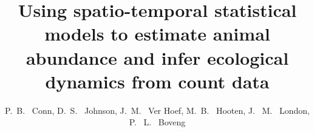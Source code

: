 \documentclass[times,mee,doublespace,]{besauth2}
\begin{document}


\title{Using spatio-temporal statistical models to estimate animal abundance and infer ecological dynamics from count data} %

\author{P.~B. ~Conn\corrauth, D.~S. ~Johnson, J.~M. ~Ver Hoef, M.~B. ~Hooten,  J. ~M. ~London, P. ~L. ~Boveng}


\address{National Marine Mammal Laboratory, Alaska Fisheries Science Center, NOAA National Marine Fisheries Service, 7600 Sand Point Way NE, Seattle, WA 98115 USA;U.S. Geological Survey, Colorado Cooperative Fish and Wildlife Research Unit, Colorado State University, Fort Collins, CO 80523 USA; Department of Fish, Wildlife, and Conservation Biology, Colorado State University, Fort Collins, CO 80523 USA;Department of Statistics, Colorado State University, Fort Collins, CO 80523 USA}

\end{document}
